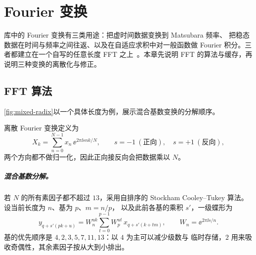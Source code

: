 \chapter{Fourier 变换}
\label{ch:fourier}

库中的 Fourier 变换有三类用途：把虚时间数据变换到 Matsubara 频率、
把稳态数据在时间与频率之间往返、以及在自适应求积中对一般函数做
Fourier 积分。三者都建立在一个自写的任意长度 FFT 之上~\cite{cooley1965,bluestein1970}。本章先说明
FFT 的算法与缓存，再说明三种变换的离散化与修正。

\section{FFT 算法}
\label{sec:fft}

\cref{fig:mixed-radix}以一个具体长度为例，展示混合基数变换的分解顺序。

离散 Fourier 变换定义为
\begin{equation}
    X_k = \sum^{N-1}_{n=0} x_n\,\ee^{2\pi\ii s nk/N},
    \qquad s=-1\ (\text{正向}),\quad s=+1\ (\text{反向}),
    \label{eq:dft}
\end{equation}
两个方向都不做归一化，因此正向接反向会把数据乘以 $N$。

\paragraph{混合基数分解。}
若 $N$ 的所有素因子都不超过 $13$，采用自排序的 Stockham
Cooley--Tukey 算法。设当前长度为 $n$、基为 $p$、$m=n/p$，
以及此前各基的乘积 $s'$，一级蝶形为
\begin{equation}
    y_{q+s'(pk+u)} =
    W^{uk}_{n}\sum^{p-1}_{t=0} W^{ut}_{p}\,
      x_{q+s'(k+tm)},
    \qquad W_n = \ee^{2\pi\ii s/n}.
    \label{eq:stockham}
\end{equation}
基的优先顺序是 $4,2,3,5,7,11,13$：以 $4$ 为主可以减少级数与
临时存储，$2$ 用来吸收奇偶性，其余素因子按从大到小排出。

